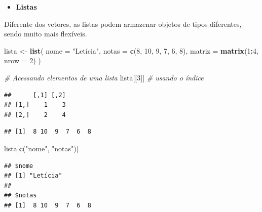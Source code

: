 \documentclass[
]{book}
\newenvironment{Shaded}{\begin{snugshade}}{\end{snugshade}}
\newcommand{\AttributeTok}[1]{\textcolor[rgb]{0.13,0.29,0.53}{#1}}
\newcommand{\CommentTok}[1]{\textcolor[rgb]{0.56,0.35,0.01}{\textit{#1}}}
\newcommand{\DecValTok}[1]{\textcolor[rgb]{0.00,0.00,0.81}{#1}}
\newcommand{\FunctionTok}[1]{\textcolor[rgb]{0.13,0.29,0.53}{\textbf{#1}}}
\newcommand{\NormalTok}[1]{#1}
\newcommand{\OtherTok}[1]{\textcolor[rgb]{0.56,0.35,0.01}{#1}}
\newcommand{\SpecialCharTok}[1]{\textcolor[rgb]{0.81,0.36,0.00}{\textbf{#1}}}
\newcommand{\StringTok}[1]{\textcolor[rgb]{0.31,0.60,0.02}{#1}}
\providecommand{\tightlist}{%
  \setlength{\itemsep}{0pt}\setlength{\parskip}{0pt}}
\begin{document}
\begin{itemize}
\tightlist
\item
  \textbf{Listas}
\end{itemize}

Diferente dos vetores, as listas podem armazenar objetos de tipos diferentes, sendo muito mais flexíveis.

\begin{Shaded}
\begin{Highlighting}[]
\NormalTok{lista }\OtherTok{\textless{}{-}} \FunctionTok{list}\NormalTok{(}
  \AttributeTok{nome =} \StringTok{"Letícia"}\NormalTok{,}
  \AttributeTok{notas =} \FunctionTok{c}\NormalTok{(}\DecValTok{8}\NormalTok{, }\DecValTok{10}\NormalTok{, }\DecValTok{9}\NormalTok{, }\DecValTok{7}\NormalTok{, }\DecValTok{6}\NormalTok{, }\DecValTok{8}\NormalTok{),}
  \AttributeTok{matriz =} \FunctionTok{matrix}\NormalTok{(}\DecValTok{1}\SpecialCharTok{:}\DecValTok{4}\NormalTok{, }\AttributeTok{nrow =} \DecValTok{2}\NormalTok{)}
\NormalTok{)}

\CommentTok{\# Acessando elementos de uma lista}
\NormalTok{lista[[}\DecValTok{3}\NormalTok{]] }\CommentTok{\# usando o índice}
\end{Highlighting}
\end{Shaded}

\begin{verbatim}
##      [,1] [,2]
## [1,]    1    3
## [2,]    2    4
\end{verbatim}

\begin{Shaded}
\end{Shaded}

\begin{verbatim}
## [1]  8 10  9  7  6  8
\end{verbatim}

\begin{Shaded}
\begin{Highlighting}[]
\NormalTok{lista[}\FunctionTok{c}\NormalTok{(}\StringTok{"nome"}\NormalTok{, }\StringTok{"notas"}\NormalTok{)]}
\end{Highlighting}
\end{Shaded}

\begin{verbatim}
## $nome
## [1] "Letícia"
## 
## $notas
## [1]  8 10  9  7  6  8
\end{verbatim}
\end{document}
